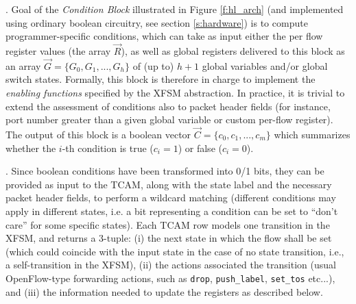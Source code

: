 \documentclass{sig-alternate}
\begin{document}
\vspace{3pt} . Goal of the {\em Condition Block} illustrated in Figure \ref{f:hl_arch} (and implemented using ordinary boolean circuitry, see section \ref{s:hardware}) is to compute programmer-specific conditions, which can take as input either the per flow register values (the array $\vec{R}$), as well as global registers delivered to this block as an array $\vec{G} = \{G_0, G_1, ..., G_h\}$ of (up to) $h+1$ global variables and/or global switch states. Formally, this block is therefore in charge to implement the {\em enabling functions} specified by the XFSM abstraction. In practice, it is trivial to extend the assessment of conditions also to packet header fields (for instance, port number greater than a given global variable or custom per-flow register). The output of this block is a boolean vector $\vec{C} = \{c_0, c_1, ..., c_m\}$ which summarizes whether  the $i$-th condition is true ($c_i=1$) or false ($c_i=0$). 

\vspace{3pt} . Since boolean conditions have been transformed into 0/1 bits, they can be provided as input to the TCAM, along with the state label and the necessary packet header fields, to perform a wildcard matching (different conditions may apply in different states, i.e. a bit representing a condition can be set to ``don't care'' for some specific states). Each TCAM row models one transition in the XFSM, and returns a 3-tuple: (i) the next state in which the flow shall be set (which could coincide with the input state in the case of no state transition, i.e., a self-transition in the XFSM), (ii) the actions associated the transition (usual OpenFlow-type forwarding actions, such as \texttt{drop}, \texttt{push\_label}, \texttt{set\_tos} etc...), and (iii) the information needed to update the registers as described below. 
\end{document}
